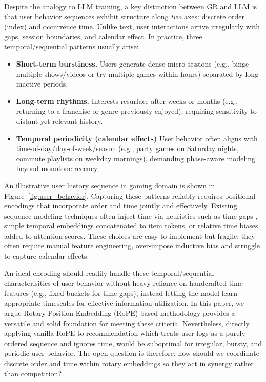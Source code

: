 \documentclass[sigconf]{acmart}
\begin{document}
Despite the analogy to LLM training, a key distinction between GR and LLM is that user behavior sequences exhibit structure along \emph{two} axes: discrete order (index) and occurrence time. Unlike text, user interactions arrive irregularly with gaps, session boundaries, and calendar effect. In practice, three temporal/sequential patterns usually arise:
\begin{itemize}
\item \textbf{Short-term burstiness.} Users generate dense micro-sessions (e.g., binge multiple shows/videos or try multiple games within hours) separated by long inactive periods.
\item \textbf{Long-term rhythms.} Interests resurface after weeks or months (e.g., returning to a franchise or genre previously enjoyed), requiring sensitivity to distant yet relevant history.
\item \textbf{Temporal periodicity (calendar effects)} User behavior often aligns with time-of-day/day-of-week/season (e.g., party games on Saturday nights, commute playlists on weekday mornings), demanding phase-aware modeling beyond monotone recency.
\end{itemize}
\noindent An illustrative user history sequence in gaming domain is shown in Figure~\ref{fig:user_behavior}. Capturing these patterns reliably requires positional encodings that incorporate order and time jointly and effectively. Existing sequence modeling techniques often inject time via heuristics such as time gaps \cite{Li2020TimeIA, Chen2022TimeLA}, simple temporal embeddings \cite{Zhou2025OneRecTR} concatenated to item tokens, or relative time biases \cite{Si2024TWINV2} \cite{Zhai2024ActionsSL} added to attention scores. These choices are easy to implement but fragile: they often require manual feature engineering, over-impose inductive bias and struggle to capture calendar effects.



An ideal encoding should readily handle these temporal/sequential characterisitics of user behavior without heavy reliance on handcrafted time features (e.g., fixed buckets for time gaps), instead letting the model learn appropriate timescales for effective information utilization. In this paper, we argue Rotary Position Embedding (RoPE) \cite{Su2021RoFormerET} based methodology provides a versatile and solid foundation for meeting these criteria. Nevertheless, directly applying vanilla RoPE to recommendation which treats user logs as a purely ordered sequence and ignores time, would be suboptimal for irregular, bursty, and periodic user behavior. The open question is therefore: how should we coordinate discrete order and time within rotary embeddings so they act in synergy rather than competition?
\end{document}
